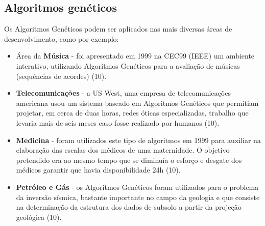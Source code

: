 \subsection{Algoritmos genéticos}



Os Algoritmos Genéticos podem ser aplicados nas mais diversas áreas de desenvolvimento, como por exemplo:
\begin{itemize}
\item Área da \textbf{Música} - foi apresentado em 1999 na CEC99 (IEEE) um ambiente interativo, utilizando Algoritmos Genéticos para a avaliação de músicas (sequências de acordes) (10).
\item \textbf{Telecomunicações} - a US West, uma empresa de telecomunicações americana usou um sistema baseado em Algoritmos Genéticos que permitiam projetar, em cerca de duas horas, redes óticas especializadas, trabalho que levaria mais de seis meses caso fosse realizado por humanos (10).
\item \textbf{Medicina} - foram utilizados este tipo de algoritmos em 1999 para auxiliar na elaboração das escalas dos médicos de uma maternidade. O objetivo pretendido era ao mesmo tempo que se diminuía o esforço e desgate dos médicos garantir que havia disponibilidade 24h (10).
\item \textbf{Petróleo e Gás} - os Algoritmos Genéticos foram utilizados para o problema da inversão sísmica, bastante importante no campo da geologia e que consiste na determinação da estrutura dos dados de subsolo a partir da projeção geológica (10).
\end{itemize}
